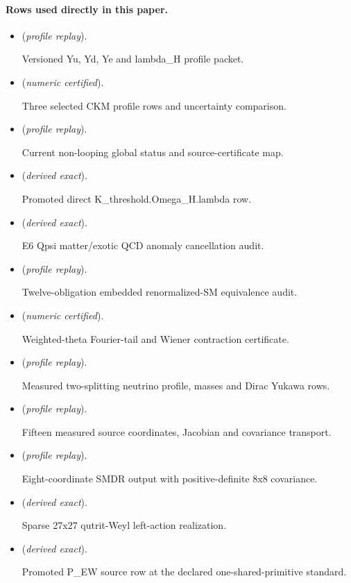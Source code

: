 \documentclass[11pt]{article}
\begin{document}
\paragraph{Rows used directly in this paper.}
\begin{itemize}
\setlength{\itemsep}{0.25em}
\item {} (\emph{profile replay}).\par Versioned Yu, Yd, Ye and lambda\_H profile packet.
\item {} (\emph{numeric certified}).\par Three selected CKM profile rows and uncertainty comparison.
\item {} (\emph{profile replay}).\par Current non-looping global status and source-certificate map.
\item {} (\emph{derived exact}).\par Promoted direct K\_threshold.Omega\_H.lambda row.
\item {} (\emph{derived exact}).\par E6 Qpsi matter/exotic QCD anomaly cancellation audit.
\item {} (\emph{profile replay}).\par Twelve-obligation embedded renormalized-SM equivalence audit.
\item {} (\emph{numeric certified}).\par Weighted-theta Fourier-tail and Wiener contraction certificate.
\item {} (\emph{profile replay}).\par Measured two-splitting neutrino profile, masses and Dirac Yukawa rows.
\item {} (\emph{profile replay}).\par Fifteen measured source coordinates, Jacobian and covariance transport.
\item {} (\emph{profile replay}).\par Eight-coordinate SMDR output with positive-definite 8x8 covariance.
\item {} (\emph{derived exact}).\par Sparse 27x27 qutrit-Weyl left-action realization.
\item {} (\emph{derived exact}).\par Promoted P\_EW source row at the declared one-shared-primitive standard.
\end{itemize}
\end{document}
